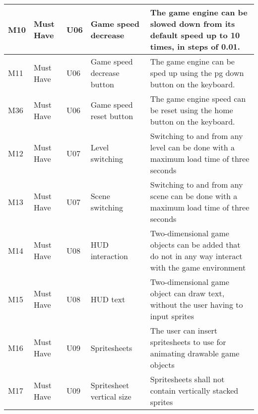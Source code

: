 \documentclass{article} %
\begin{document}
\begin{longtable}{|p{}|p{}|p{}|p{}|p{}|}
    M10                         & Must Have                          & U06                & Game speed decrease         & The game engine can be slowed down from its default speed up to 10 times, in steps of 0.01.                                                                 \\ \hline
    M11                         & Must Have                          & U06                & Game speed decrease button  & The game engine can be sped up using the pg down button on the keyboard.                                                                                    \\ \hline
    M36 & Must Have & U06 & Game speed reset button & The game engine speed can be reset using the home button on the keyboard. \\ \hline
    M12                         & Must Have                          & U07                & Level switching             & Switching to and from any level can be done with a maximum load time of three seconds                                                                       \\ \hline
    M13                         & Must Have                          & U07                & Scene switching             & Switching to and from any scene can be done with a maximum load time of three seconds                                                                       \\ \hline
    M14                         & Must Have                          & U08                & HUD interaction             & Two-dimensional game objects can be added that do not in any way interact with the game environment                                                         \\ \hline
    M15                         & Must Have                          & U08                & HUD text                    & Two-dimensional game object can draw text, without the user having to input sprites                                                                         \\ \hline
    M16                         & Must Have                          & U09                & Spritesheets                & The user can insert spritesheets to use for animating drawable game objects                                                                                 \\ \hline
    M17                         & Must Have                          & U09                & Spritesheet vertical size   & Spritesheets shall not contain vertically stacked sprites                                                                                                   \\ \hline

\end{longtable}
\end{document}
